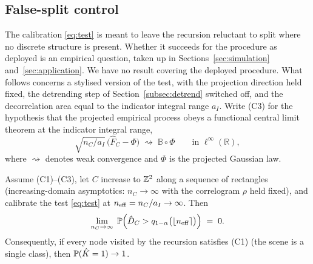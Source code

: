 \subsection{False-split control}\label{subsec:prop}

The calibration \eqref{eq:test} is meant to leave the recursion
reluctant to split where no discrete structure is present. Whether it succeeds
for the procedure as deployed is an empirical question, taken up in
Sections~\ref{sec:simulation} and~\ref{sec:application}.
 We have no result covering the deployed procedure. What follows
concerns a stylised version of the test, with the projection direction held
fixed, the detrending step of Section~\ref{subsec:detrend} switched off, and
the decorrelation area equal to the indicator integral range $a_I$.  Write \textnormal{(C3)} for the hypothesis that the
projected empirical process obeys a functional central limit theorem at the
indicator integral range,
%
\begin{equation}\label{eq:c3}
\sqrt{n_C/a_I}\,\bigl(\hat F_C-\Phi\bigr)\;\rightsquigarrow\;\mathbb{B}\circ\Phi
\qquad\text{in } \ell^\infty(\mathbb{R}),
\end{equation}
where $\rightsquigarrow$ denotes weak convergence
\citep[Ch.~1]{vanderVaartWellner1996} and $\Phi$ is the projected Gaussian law.

\begin{proposition}\label{prop:fpr}
Assume \textnormal{(C1)--(C3)}, let $C$ increase to $\mathbb{Z}^2$ along a
sequence of rectangles (increasing-domain asymptotics: $n_C\to\infty$ with
the correlogram $\rho$ held fixed), and calibrate
the test \eqref{eq:test} at $n_{\mathrm{eff}}=n_C/a_I\to\infty$. Then
%
\begin{equation}\label{eq:limsup}
\lim_{n_C\to\infty}\;
\mathbb{P}\Bigl(\hat D_C > q_{1-\alpha}\bigl(\lfloor n_{\mathrm{eff}}\rceil\bigr)\Bigr)
\;=\;0.
\end{equation}
Consequently, if every node visited by the recursion satisfies \textnormal{(C1)}
(the scene is a single class), then $\mathbb{P}(\hat K=1)\to1$.
\end{proposition}

